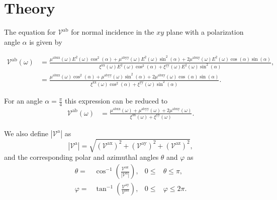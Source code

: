 \documentclass[twocolumn]{article}
\let\Oldsection\section
\renewcommand{\section}{\FloatBarrier\Oldsection}
\begin{document}
\section{Theory} %
\label{sec:theory}
The equation for $\mathcal{V}^{\mathrm{ab}}$ for normal incidence in the $xy$
plane with a polarization angle $\alpha$ is given by

\begin{strip}
\begin{align}
\mathcal{V}^{\mathrm{ab}} (\omega) 
&= \frac{\mu^{\mathrm{abxx}}(\omega)
E^{2}(\omega)\cos^{2}(\alpha) + 
\mu^{\mathrm{abyy}}(\omega)
E^{2}(\omega)\sin^{2}(\alpha) + 
2\mu^{\mathrm{abxy}}(\omega)
E^{2}(\omega)\cos(\alpha)\sin(\alpha)}
{\xi^{\mathrm{xx}}(\omega)
E^{2}(\omega)\cos^{2}(\alpha) + 
\xi^{\mathrm{yy}}(\omega)
E^{2}(\omega)\sin^{2}(\alpha)},
\nonumber \\
&= \frac{\mu^{\mathrm{abxx}}(\omega)\cos^{2}(\alpha) + 
\mu^{\mathrm{abyy}}(\omega)\sin^{2}(\alpha) + 
2\mu^{\mathrm{abxy}}(\omega)\cos(\alpha)\sin(\alpha)}
{\xi^{\mathrm{xx}}(\omega)\cos^{2}(\alpha) + 
\xi^{\mathrm{yy}}(\omega)\sin^{2}(\alpha)}.
\label{eq:vab}
\end{align}
\end{strip}

For an angle $\alpha = \frac{\pi}{4}$ this expression can be reduced to 
\begin{align}
\mathcal{V}^{\mathrm{ab}} (\omega)
&= \frac{\mu^{\mathrm{abxx}}(\omega) + \mu^{\mathrm{abyy}}(\omega) + 
2\mu^{\mathrm{abxy}}(\omega)}
{\xi^{\mathrm{xx}}(\omega) + \xi^{\mathrm{yy}}(\omega)}.
\label{eq:vab-90deg}
\end{align}

We also define $|\mathcal{V}^{\mathrm{a}}|$ as 
\begin{equation}\label{eq:vab-mag}
|\mathcal{V}^{\mathrm{a}}| = 
\sqrt {
(\mathcal{V}^{\mathrm{ax}})^{2} +
(\mathcal{V}^{\mathrm{ay}})^{2} +
(\mathcal{V}^{\mathrm{az}})^{2} 
},
\end{equation}
and the corresponding polar and azimuthal angles $\theta$ and $\varphi$ as
\begin{align}
\theta  =& \cos^{-1} \left(  \frac{\mathcal{V}^{\mathrm{az}}}
{|\mathcal{V}^{\mathrm{a}}|} \right),
& 0 \leq &\theta \leq \pi, 
\label{eq:polar-ang} \\
\varphi =& \tan^{-1} \left( \frac{\mathcal{V}^{\mathrm{ay}}}{\mathcal{V}^{\mathrm{ax}}} \right),
& 0 \leq &\varphi \leq 2\pi. \\ 
\label{eq:azimuthal-ang} 
\end{align}
\end{document}
